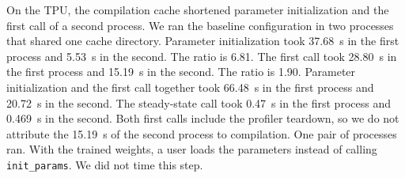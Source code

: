 On the TPU, the compilation cache shortened parameter initialization and the first call of a second process. We ran the
baseline configuration in two processes that shared one cache directory. Parameter initialization took 37.68~s in the first process and 5.53~s in the second. The ratio is 6.81. %
The first call took 28.80~s in the first process and 15.19~s in the second. The ratio is 1.90. %
Parameter initialization and the first call together took 66.48~s in the first process and 20.72~s in the second. %
The steady-state call took 0.47~s in the first process and 0.469~s in the second. %
Both first calls include the profiler teardown, so we do not attribute the 15.19~s of the second process to compilation. %
One pair of processes ran. With the trained weights, a user loads the parameters instead of calling
\texttt{init\_params}. We did not time this step.

